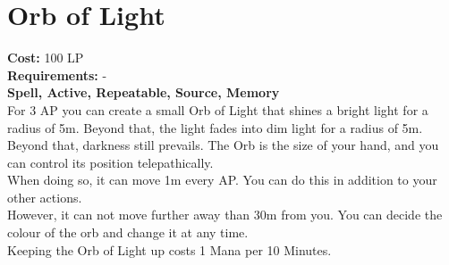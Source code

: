 \section{Orb of Light}\label{spell:orbOfLight}
\textbf{Cost:} 100 LP\\
\textbf{Requirements:} -\\
\textbf{Spell, Active, Repeatable, Source, Memory}\\
For 3 AP you can create a small Orb of Light that shines a bright light for a radius of 5m.
Beyond that, the light fades into dim light for a radius of 5m.
Beyond that, darkness still prevails.
The Orb is the size of your hand, and you can control its position telepathically.\\
When doing so, it can move 1m every AP.
You can do this in addition to your other actions.\\
However, it can not move further away than 30m from you.
You can decide the colour of the orb and change it at any time. \\
Keeping the Orb of Light up costs 1 Mana per 10 Minutes.